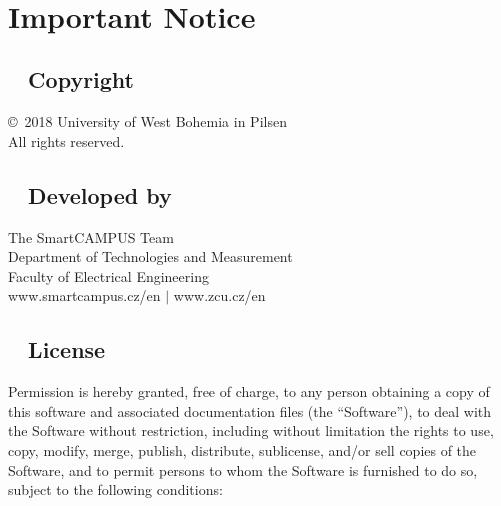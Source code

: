%
%
%

\clearpage

~

\vfill

\section*{Important Notice}

\subsection*{~\hspace{0.2cm}{\Huge \faCopyright\,} Copyright}
\vspace{-0.65cm}
\copyright ~2018 University of West Bohemia in Pilsen\\
All rights reserved.

\subsection*{~\hspace{0.2cm}{\Huge \faCogs\,} Developed by}
\vspace{-0.65cm}
The SmartCAMPUS Team\\
Department of Technologies and Measurement\\
Faculty of Electrical Engineering\\
www.smartcampus.cz/en $\mid$ www.zcu.cz/en

\subsection*{~\hspace{0.2cm}{\Huge \faCopy\,} License\footnotemark}
\vspace{-0.65cm}

Permission is hereby granted, free of charge, to any person obtaining a copy of this software and associated documentation files (the “Software”), to deal with the Software without restriction, including without limitation the rights to use, copy, modify, merge, publish, distribute, sublicense, and/or sell copies of the Software, and to permit persons to whom the Software is furnished to do so, subject to the following conditions:

